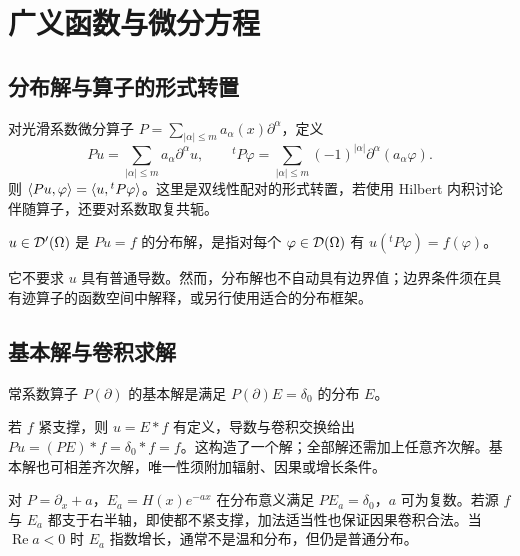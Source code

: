 \chapter{广义函数与微分方程}\label{ch:pde}

\section{分布解与算子的形式转置}
对光滑系数微分算子 $P=\sum_{|\alpha|\le m}a_\alpha(x)\partial^\alpha$，定义
\[
 Pu=\sum_{|\alpha|\le m}a_\alpha\partial^\alpha u,
 \qquad {}^tP\varphi=\sum_{|\alpha|\le m}(-1)^{|\alpha|}
 \partial^\alpha(a_\alpha\varphi).
\]
则 $\langle Pu,\varphi\rangle=\langle u,{}^tP\varphi\rangle$。这里是双线性配对的形式转置，若使用 Hilbert 内积讨论伴随算子，还要对系数取复共轭。
\begin{definition}[分布解]
$u\in\mathcal{D}'(\Omega)$ 是 $Pu=f$ 的分布解，是指对每个 $\varphi\in\mathcal{D}(\Omega)$ 有 $u({}^tP\varphi)=f(\varphi)$。
\end{definition}
它不要求 $u$ 具有普通导数。然而，分布解也不自动具有边界值；边界条件须在具有迹算子的函数空间中解释，或另行使用适合的分布框架。

\section{基本解与卷积求解}
\begin{definition}[基本解]
常系数算子 $P(\partial)$ 的基本解是满足 $P(\partial)E=\delta_0$ 的分布 $E$。
\end{definition}
若 $f$ 紧支撑，则 $u=E*f$ 有定义，导数与卷积交换给出 $Pu=(PE)*f=\delta_0*f=f$。这构造了一个解；全部解还需加上任意齐次解。基本解也可相差齐次解，唯一性须附加辐射、因果或增长条件。
\begin{example}[一阶因果基本解]
对 $P=\partial_x+a$，$E_a=H(x)e^{-ax}$ 在分布意义满足 $PE_a=\delta_0$，$a$ 可为复数。若源 $f$ 与 $E_a$ 都支于右半轴，即使都不紧支撑，加法适当性也保证因果卷积合法。当 $\operatorname{Re}a<0$ 时 $E_a$ 指数增长，通常不是温和分布，但仍是普通分布。
\end{example}

